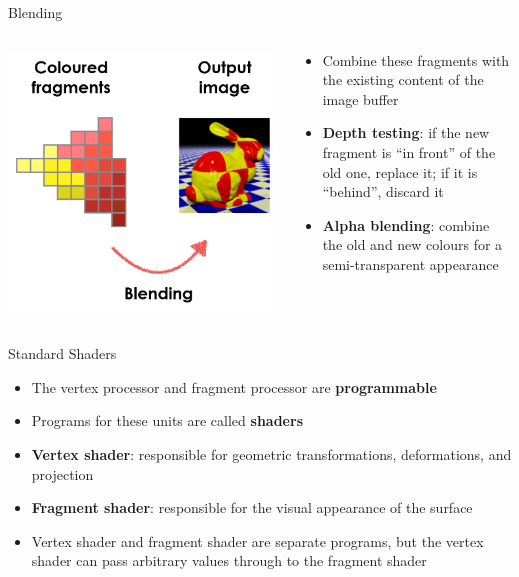 \begin{frame}{Blending}
	\begin{columns}
		\begin{column}{0.3\textwidth}
			\includegraphics[width=\textwidth]{pipeline_4}
		\end{column}
		\begin{column}{0.65\textwidth}
			\begin{itemize}
				\pause\item Combine these fragments with the existing content of the image buffer
				\pause\item \textbf{Depth testing}: if the new fragment is ``in front'' of the old one, replace it;
					if it is ``behind'', discard it
				\pause\item \textbf{Alpha blending}: combine the old and new colours for a semi-transparent appearance
			\end{itemize}
		\end{column}
	\end{columns}
\end{frame}

\begin{frame}{Standard Shaders}
	\begin{itemize}
		\pause\item The vertex processor and fragment processor are \textbf{programmable}
		\pause\item Programs for these units are called \textbf{shaders}
		\pause\item \textbf{Vertex shader}: responsible for geometric transformations, deformations, and projection
		\pause\item \textbf{Fragment shader}: responsible for the visual appearance of the surface
		\pause\item Vertex shader and fragment shader are separate programs,
			but the vertex shader can pass arbitrary values through to the fragment shader
	\end{itemize}
\end{frame}

